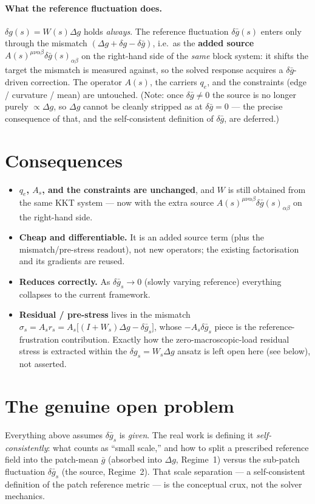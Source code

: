 \documentclass[11pt]{article}
\newcommand{\dg}{\delta g}
\newcommand{\dgb}{\delta\bar g}
\newcommand{\Dg}{\Delta g}
\begin{document}
\paragraph{What the reference fluctuation does.}
$\dg(s) = W(s)\Dg$ holds \emph{always}. The reference fluctuation $\dgb(s)$ enters only through the
mismatch $(\Dg+\dg-\dgb)$, i.e.\ as the \textbf{added source} $A(s)^{\mu\nu\alpha\beta}\dgb(s)_{\alpha\beta}$
on the right-hand side of the \emph{same} block system: it shifts the target the mismatch is measured
against, so the solved response acquires a $\dgb$-driven correction. The operator $A(s)$, the carriers
$q_e$, and the constraints (edge / curvature / mean) are untouched. (Note: once $\dgb\neq0$ the source is
no longer purely $\propto\Dg$, so $\Dg$ cannot be cleanly stripped as at $\dgb=0$ --- the precise
consequence of that, and the self-consistent definition of $\dgb$, are deferred.)

\section*{Consequences}

\begin{itemize}[leftmargin=1.6em]
\item \textbf{$q_e$, $A_s$, and the constraints are unchanged}, and $W$ is still obtained from the same
KKT system --- now with the extra source $A(s)^{\mu\nu\alpha\beta}\dgb(s)_{\alpha\beta}$ on the
right-hand side.
\item \textbf{Cheap and differentiable.} It is an added source term (plus the mismatch/pre-stress
readout), not new operators; the existing factorisation and its gradients are reused.
\item \textbf{Reduces correctly.} As $\dgb_s \to 0$ (slowly varying reference) everything collapses to the
current framework.
\item \textbf{Residual / pre-stress} lives in the mismatch $\sigma_s = A_s r_s = A_s\bigl[(I+W_s)\Dg
- \dgb_s\bigr]$, whose $-A_s\dgb_s$ piece is the reference-frustration contribution. Exactly how the
zero-macroscopic-load residual stress is extracted within the $\dg_s = W_s\Dg$ ansatz is left open here
(see below), not asserted.
\end{itemize}

\section*{The genuine open problem}

Everything above assumes $\dgb_s$ is \emph{given}. The real work is defining it \emph{self-consistently}:
what counts as ``small scale,'' and how to split a prescribed reference field into the patch-mean $\bar g$
(absorbed into $\Dg$, Regime~1) versus the sub-patch fluctuation $\dgb_s$ (the source, Regime~2). That
scale separation --- a self-consistent definition of the patch reference metric --- is the conceptual
crux, not the solver mechanics.
\end{document}
